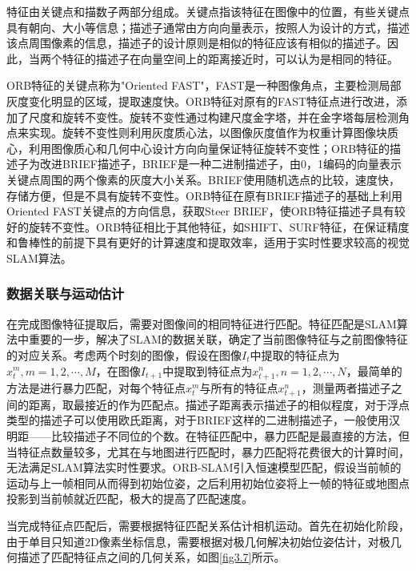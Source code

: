 特征由关键点和描数子两部分组成。关键点指该特征在图像中的位置，有些关键点具有朝向、大小等信息；描述子通常由方向向量表示，按照人为设计的方式，描述该点周围像素的信息，描述子的设计原则是相似的特征应该有相似的描述子。因此，当两个特征的描述子在向量空间上的距离接近时，可以认为是相同的特征。

ORB特征的关键点称为"Oriented FAST"，FAST是一种图像角点\upcite{[3.10]}，主要检测局部灰度变化明显的区域，提取速度快。ORB特征对原有的FAST特征点进行改进，添加了尺度和旋转不变性。旋转不变性通过构建尺度金字塔，并在金字塔每层检测角点来实现。旋转不变性则利用灰度质心法，以图像灰度值作为权重计算图像块质心，利用图像质心和几何中心设计方向向量保证特征旋转不变性；ORB特征的描述子为改进BRIEF描述子，BRIEF是一种二进制描述子\upcite{[3.11]}，由0，1编码的向量表示关键点周围的两个像素的灰度大小关系。BRIEF使用随机选点的比较，速度快，存储方便，但是不具有旋转不变性。ORB特征在原有BRIEF描述子的基础上利用Oriented FAST关键点的方向信息，获取Steer BRIEF，使ORB特征描述子具有较好的旋转不变性。ORB特征相比于其他特征，如SHIFT、SURF特征，在保证精度和鲁棒性的前提下具有更好的计算速度和提取效率，适用于实时性要求较高的视觉SLAM算法。

\subsubsection{数据关联与运动估计}
在完成图像特征提取后，需要对图像间的相同特征进行匹配。特征匹配是SLAM算法中重要的一步，解决了SLAM的数据关联，确定了当前图像特征与之前图像特征的对应关系。考虑两个时刻的图像，假设在图像$I_t$中提取的特征点为$x_t^m,m=1,2,\cdots,M$，在图像$I_{t+1}$中提取到特征点为$x_{t+1}^n,n=1,2,\cdots,N$，最简单的方法是进行暴力匹配，对每个特征点$x_t^m$与所有的特征点$x_{t+1}^n$，测量两者描述子之间的距离，取最接近的作为匹配点。描述子距离表示描述子的相似程度，对于浮点类型的描述子可以使用欧氏距离，对于BRIEF这样的二进制描述子，一般使用汉明距——比较描述子不同位的个数。在特征匹配中，暴力匹配是最直接的方法，但当特征点数量较多，尤其在与地图进行匹配时，暴力匹配将花费很大的计算时间，无法满足SLAM算法实时性要求。ORB-SLAM引入恒速模型匹配，假设当前帧的运动与上一帧相同从而得到初始位姿，之后利用初始位姿将上一帧的特征或地图点投影到当前帧就近匹配，极大的提高了匹配速度。

当完成特征点匹配后，需要根据特征匹配关系估计相机运动。首先在初始化阶段，由于单目只知道2D像素坐标信息，需要根据对极几何解决初始位姿估计，对极几何描述了匹配特征点之间的几何关系，如图\ref{fig3.7}所示。

